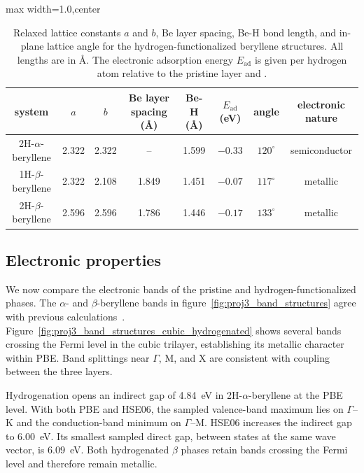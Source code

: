 \begin{table}[!htbp]
\centering
{}
\begin{adjustbox}{max width=1.0\linewidth,center}
\begin{tabular}{cccccccc}
\hline
\rowcolor{gray!25}
system
& $a$
& $b$
& Be layer spacing (\AA)
& Be-H (\AA)
& $E_{\mathrm{ad}}$ (eV)
& angle
& electronic nature \\
\hline
2H-$\alpha$-beryllene
& 2.322 & 2.322 & -- & 1.599 & $-0.33$ & $120^{\circ}$ & semiconductor \\
1H-$\beta$-beryllene
& 2.322 & 2.108 & 1.849 & 1.451 & $-0.07$ & $117^{\circ}$ & metallic \\
2H-$\beta$-beryllene
& 2.596 & 2.596 & 1.786 & 1.446 & $-0.17$ & $133^{\circ}$ & metallic \\
\hline
\end{tabular}
\end{adjustbox}
\caption{Relaxed lattice constants $a$ and $b$, Be layer spacing, Be-H bond length, and in-plane lattice angle for the hydrogen-functionalized beryllene structures.
All lengths are in \unit{\angstrom}.
The electronic adsorption energy $E_{\mathrm{ad}}$ is given per hydrogen atom relative to the pristine layer and .}
\label{tab:proj3_hydrogenated_structural_parameters}
\end{table}

\FloatBarrier
\subsection{Electronic properties}
\label{3_electronic_properties}

We now compare the electronic bands of the pristine and hydrogen-functionalized phases.
The $\alpha$- and $\beta$-beryllene bands in figure~\ref{fig:proj3_band_structures} agree with previous calculations~\cite{li2023coexistence}.
Figure~\ref{fig:proj3_band_structures_cubic_hydrogenated} shows several bands crossing the Fermi level in the cubic trilayer, establishing its metallic character within PBE.
Band splittings near $\Gamma$, $\mathrm{M}$, and $\mathrm{X}$ are consistent with coupling between the three layers.

Hydrogenation opens an indirect gap of \qty{4.84}{\electronvolt} in 2H-$\alpha$-beryllene at the PBE level.
With both PBE and HSE06, the sampled valence-band maximum lies on $\Gamma$--$\mathrm{K}$ and the conduction-band minimum on $\Gamma$--$\mathrm{M}$.
HSE06 increases the indirect gap to \qty{6.00}{\electronvolt}.
Its smallest sampled direct gap, between states at the same wave vector, is \qty{6.09}{\electronvolt}.
Both hydrogenated $\beta$ phases retain bands crossing the Fermi level and therefore remain metallic.

